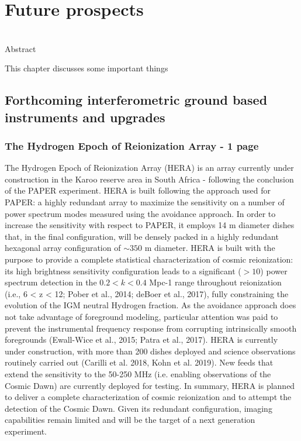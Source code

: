 \chapter{Future prospects}

\begin{bf}
  \author{Leon V. E. Koopmans (Kapteyn Astronomical Institute), Gianni Bernardi (INAF-IRA \& Rhodes University)}\\
  
Abstract\\
\end{bf}

This chapter discusses some important things

\section{Forthcoming interferometric ground based instruments and upgrades}

\subsection{The Hydrogen Epoch of Reionization Array - 1 page}
The Hydrogen Epoch of Reionization Array (HERA) is an array currently under construction in the Karoo reserve area in South Africa - following the conclusion of the PAPER experiment. HERA is built following the approach used for PAPER: a highly redundant array to maximize the sensitivity on a number of power spectrum modes measured using the avoidance approach. In order to increase the sensitivity with respect to PAPER, it employs 14 m diameter dishes that, in the final configuration, will be densely packed in a highly redundant hexagonal array configuration of $\sim 350$ m diameter. 
HERA is built with the purpose to provide a complete statistical characterization of cosmic reionization: its high brightness sensitivity configuration leads to a significant ($> 10$) power spectrum detection in the $0.2 < k < 0.4$ Mpc-1 range throughout reionization (i.e., 6 < z < 12; Pober et al., 2014; deBoer et al., 2017), fully constraining the evolution of the IGM neutral Hydrogen fraction. As the avoidance approach does not take advantage of foreground modeling, particular attention was paid to prevent the instrumental frequency response from corrupting intrinsically smooth foregrounds (Ewall-Wice et al., 2015; Patra et al., 2017).
HERA is currently under construction, with more than 200 dishes deployed and science observations routinely carried out (Carilli et al. 2018, Kohn et al. 2019). New feeds that extend the sensitivity to the 50-250 MHz (i.e. enabling observations of the Cosmic Dawn) are currently deployed for testing.
In summary, HERA is planned to deliver a complete characterization of cosmic reionization and to attempt the detection of the Cosmic Dawn. Given its redundant configuration, imaging capabilities remain limited and will be the target of a next generation experiment.


